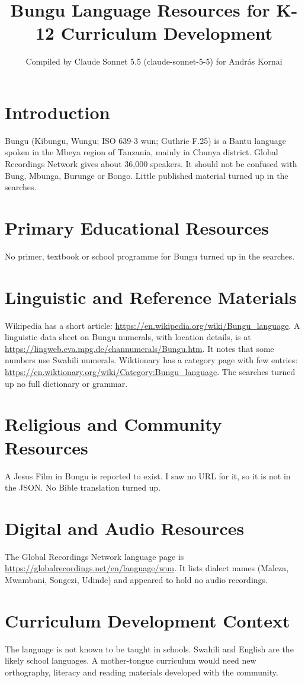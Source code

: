 \documentclass[12pt]{article}
\title{Bungu Language Resources for K-12 Curriculum Development}
\author{Compiled by Claude Sonnet 5.5 (claude-sonnet-5-5) for Andr\'as Kornai}
\date{}
\begin{document}
\maketitle

\section{Introduction}
Bungu (Kibungu, Wungu; ISO 639-3 wun; Guthrie F.25) is a Bantu language spoken in the Mbeya region of Tanzania, mainly in Chunya district. Global Recordings Network gives about 36,000 speakers. It should not be confused with Bung, Mbunga, Burunge or Bongo. Little published material turned up in the searches.

\section{Primary Educational Resources}
No primer, textbook or school programme for Bungu turned up in the searches.

\section{Linguistic and Reference Materials}
Wikipedia has a short article: \url{https://en.wikipedia.org/wiki/Bungu_language}. A linguistic data sheet on Bungu numerals, with location details, is at \url{https://lingweb.eva.mpg.de/channumerals/Bungu.htm}. It notes that some numbers use Swahili numerals. Wiktionary has a category page with few entries: \url{https://en.wiktionary.org/wiki/Category:Bungu_language}. The searches turned up no full dictionary or grammar.

\section{Religious and Community Resources}
A Jesus Film in Bungu is reported to exist. I saw no URL for it, so it is not in the JSON. No Bible translation turned up.

\section{Digital and Audio Resources}
The Global Recordings Network language page is \url{https://globalrecordings.net/en/language/wun}. It lists dialect names (Maleza, Mwambani, Songezi, Udinde) and appeared to hold no audio recordings.

\section{Curriculum Development Context}
The language is not known to be taught in schools. Swahili and English are the likely school languages. A mother-tongue curriculum would need new orthography, literacy and reading materials developed with the community.
\end{document}
